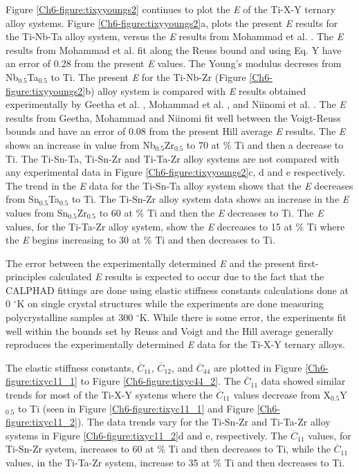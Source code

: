 Figure \ref{Ch6-figure:tixyyoungs2} continues to plot the \textit{E} of the Ti-X-Y ternary alloy systems. Figure \ref{Ch6-figure:tixyyoungs2}a, plots the present \textit{E} results for the Ti-Nb-Ta alloy system, versus the \textit{E} results from Mohammad et al. \cite{Mohammed2014}. The \textit{E} results from Mohammad et al. fit along the Reuss bound and using Eq. Y have an error of 0.28 from the present \textit{E} values. The Young's modulus decreses from Nb$_{0.5}$Ta$_{0.5}$ to Ti. The present \textit{E} for the Ti-Nb-Zr (Figure \ref{Ch6-figure:tixyyoungs2}b) alloy system is compared with \textit{E} results obtained experimentally by Geetha et al. \cite{Geetha2009},  Mohammad et al. \cite{Mohammed2014}, and Niinomi et al. \cite{Niinomi2012}. The \textit{E} results from Geetha, Mohammad and Niinomi fit well between the Voigt-Reuss bounds and have an error of 0.08 from the present Hill average \textit{E} results. The \textit{E} shows an increase in value from Nb$_{0.5}$Zr$_{0.5}$ to 70 at \% Ti and then a decrease to Ti. The Ti-Sn-Ta, Ti-Sn-Zr and Ti-Ta-Zr alloy systems are not compared with any experimental data in Figure \ref{Ch6-figure:tixyyoungs2}c, d and e respectively. The trend in the \textit{E} data for the Ti-Sn-Ta alloy system shows that the \textit{E} decreases from Sn$_{0.5}$Ta$_{0.5}$ to Ti. The Ti-Sn-Zr alloy system data shows an increase in the \textit{E} values from Sn$_{0.5}$Zr$_{0.5}$ to 60 at \% Ti and then the \textit{E} decreases to Ti. The \textit{E} values, for the Ti-Ta-Zr alloy system, show the \textit{E} decreases to 15 at \% Ti where the \textit{E} begins increasing to 30 at \% Ti and then decreases to Ti. 

The error between the experimentally determined \textit{E} and the present first-principles calculated \textit{E} results is expected to occur due to the fact that the CALPHAD fittings are done using elastic stiffness constants calculations done at 0 $^\circ$K on single crystal structures while the experiments are done measuring polycrystalline samples at 300 $^\circ$K. While there is some error, the experiments fit well within the bounds set by Reuss and Voigt and the Hill average generally reproduces the experimentally determined \textit{E} data for the Ti-X-Y ternary alloys. 

The elastic stiffness constants, $\overline{C}_{11}$, $\overline{C}_{12}$, and $\overline{C}_{44}$ are plotted in Figure \ref{Ch6-figure:tixyc11_1} to Figure \ref{Ch6-figure:tixyc44_2}. The $\overline{C}_{11}$ data showed similar trends for most of the Ti-X-Y systems where the $\overline{C}_{11}$ values decrease from X$_{0.5}$Y$_{0.5}$ to Ti (seen in Figure \ref{Ch6-figure:tixyc11_1} and Figure \ref{Ch6-figure:tixyc11_2}). The  data trends vary for the Ti-Sn-Zr and Ti-Ta-Zr alloy systems in Figure \ref{Ch6-figure:tixyc11_2}d and e, respectively. The $\overline{C}_{11}$ values, for Ti-Sn-Zr system, increases to 60 at \% Ti and then decreases to Ti, while the $\overline{C}_{11}$ values, in the Ti-Ta-Zr system, increase to 35 at \% Ti and then decreases to Ti. 

